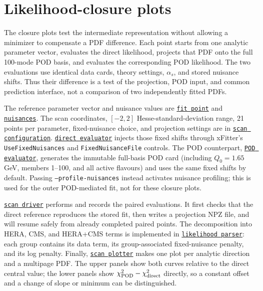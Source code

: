 \documentclass[11pt]{article}
\newcommand{\incljetscode}[2]{\href{https://github.com/HephyAnalysisSW/InclJets/blob/main/#1}{\texttt{#2}}}
\begin{document}
\section{Likelihood-closure plots}

The closure plots test the intermediate representation without allowing a
minimizer to compensate a PDF difference. Each point starts from one analytic
parameter vector, evaluates the direct likelihood, projects that PDF onto the
full 100-mode POD basis, and evaluates the corresponding POD likelihood. The
two evaluations use identical data cards, theory settings, $\alpha_s$, and
stored nuisance shifts. Thus their difference is a test of the projection,
POD input, and common prediction interface, not a comparison of two
independently fitted PDFs.

The reference parameter vector and nuisance values are
\incljetscode{fits/SMP-22-014/figure2/reference_fit/fit_result.yaml}{fit point}
and
\incljetscode{fits/SMP-22-014/figure2/reference_fit/nuisances.yaml}{nuisances}.
The scan coordinates, $[-2,2]$ Hesse-standard-deviation range, 21 points per
parameter, fixed-nuisance choice, and projection settings are in
\incljetscode{fits/SMP-22-014/figure2/likelihood_scans/scan_config.yaml}{scan configuration}.
\incljetscode{fits/SMP-22-014/figure2/likelihood_scans/evaluate_direct.py}{direct evaluator}
injects those fixed shifts through xFitter's \texttt{UseFixedNuisances} and
\texttt{FixedNuisanceFile} controls. The POD counterpart,
\incljetscode{fits/SMP-22-014/figure2/likelihood_scans/evaluate_pod.py}{POD evaluator},
generates the immutable full-basis POD card (including $Q_0=1.65$ GeV,
members 1--100, and all active flavours) and uses the same fixed shifts by
default. Passing \texttt{--profile-}\allowbreak\texttt{nuisances} instead activates nuisance
profiling; this is used for the outer POD-mediated fit, not for these closure
plots.

\incljetscode{fits/SMP-22-014/figure2/likelihood_scans/run_likelihood_scan.py}{scan driver}
performs and records the paired evaluations. It first checks that the direct
reference reproduces the stored fit, then writes a projection NPZ file, and
will resume safely from already completed paired points. The decomposition
into HERA, CMS, and HERA+CMS terms is implemented in
\incljetscode{fits/SMP-22-014/figure2/likelihood_scans/scan_tools.py}{likelihood parser}:
each group contains its data term, its group-associated fixed-nuisance penalty,
and its log penalty. Finally,
\incljetscode{fits/SMP-22-014/figure2/likelihood_scans/plot_likelihood_scan.py}{scan plotter}
makes one plot per analytic direction and a multipage PDF. The upper panels
show both curves relative to the direct central value; the lower panels show
$\chi^2_{\rm POD}-\chi^2_{\rm direct}$ directly, so a constant offset and a
change of slope or minimum can be distinguished.
\end{document}
